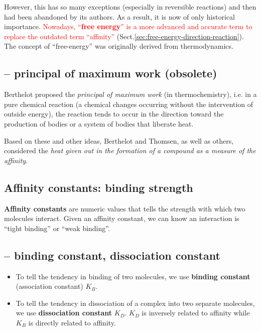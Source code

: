 However, this has so many exceptions (especially in reversible reactions) and
then had been abandoned by its authors. As a result, it is now of only
historical importance. \textcolor{red}{Nowadays, ``{\bf free energy}'' is a more
advanced and accurate term to replace the outdated term ``affinity''}
(Sect.\ref{sec:free-energy-direction-reaction}).
The concept of ``free-energy'' was originally derived from thermodynamics.

\subsection{-- principal of maximum work (obsolete)}
\label{sec:principal-of-maximum-work}

Berthelot proposed the {\it principal of maximum work} (in thermochemistry),
i.e. in a pure chemical reaction (a chemical changes occurring without the
intervention of outside energy), the reaction tends to occur in the direction
toward the production of bodies or a system of bodies that liberate heat.

Based on these and other ideas, Berthelot and Thomsen, as well as others,
considered the {\it heat given out in the formation of a compound as a measure
of the affinity}. 



\subsection{Affinity constants: binding strength}
\label{sec:affinity-constants}

{\bf Affinity constants} are numeric values that tells the strength
with which two molecules interact. Given an affinity constant, we can
know an interaction is ``tight binding'' or ``weak binding''. 

\subsection{-- binding constant, dissociation constant}
\label{sec:binding-constant}
\label{sec:dissociation-constant}

\begin{itemize}
  \item To tell the tendency in binding of two molecules, we use
{\bf binding constant} (association constant) $K_B$. 

  \item To tell the tendency in dissociation of a complex into two separate
  molecules, we use {\bf dissociation constant} $K_D$. $K_D$ is inversely
  related to affinity while $K_B$ is directly related to affinity.
\end{itemize}

